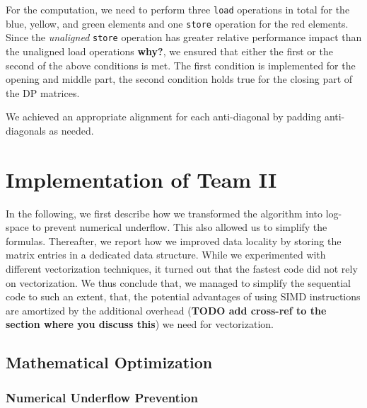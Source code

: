 \documentclass[runningheads,a4paper]{llncs}
\begin{document}
For the computation, we need to perform three \texttt{load} operations in total for the blue, yellow, and green elements and one \texttt{store} operation for the red elements. 
Since the {\em unaligned} \texttt{store} operation has greater relative performance impact than the unaligned load operations {\bf why?}, 
we ensured that either the first or the second of the above conditions is met. 
The first condition is implemented for the opening and middle part, the second condition holds true for the closing part of the DP matrices.

We achieved an appropriate alignment for each anti-diagonal by padding anti-diagonals as needed. 


\section{Implementation of Team II}

In the following, we first describe how we transformed the algorithm into log-space to prevent numerical underflow. 
This also allowed us to simplify the formulas. 
Thereafter, we report how we improved data locality by storing the matrix entries in a dedicated data structure. 
While we experimented with different vectorization techniques, it turned out that the fastest code did not rely on vectorization. 
We thus conclude that, we managed to simplify the sequential code to such an extent, that, the potential advantages of using SIMD instructions 
are amortized by the additional overhead ({\bf TODO add cross-ref to the section where you discuss this}) we need for vectorization.

\subsection{Mathematical Optimization}

\subsubsection{Numerical Underflow Prevention}
\label{sec:log}
\end{document}
